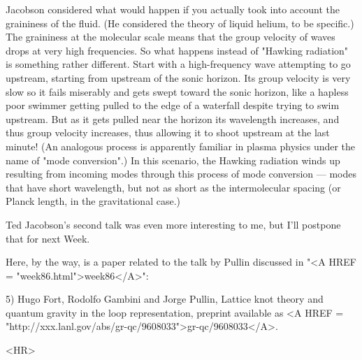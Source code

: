 Jacobson considered what would happen if you actually took into
account the graininess of the fluid.  (He considered the theory of
liquid helium, to be specific.)  The graininess at the molecular scale
means that the group velocity of waves drops at very high frequencies.
So what happens instead of "Hawking radiation" is something rather
different.  Start with a high-frequency wave attempting to go
upstream, starting from upstream of the sonic horizon.  Its group
velocity is very slow so it fails miserably and gets swept toward the
sonic horizon, like a hapless poor swimmer getting pulled to the edge
of a waterfall despite trying to swim upstream.  But as it gets pulled
near the horizon its wavelength increases, and thus group velocity
increases, thus allowing it to shoot upstream at the last minute!  (An
analogous process is apparently familiar in plasma physics under the
name of "mode conversion".)  In this scenario, the Hawking radiation
winds up resulting from incoming modes through this process of mode
conversion --- modes that have short wavelength, but not as short as
the intermolecular spacing (or Planck length, in the gravitational case.)

Ted Jacobson's second talk was even more interesting to me, but
I'll postpone that for next Week.

Here, by the way, is a paper related to the talk by Pullin discussed in 
"<A HREF = "week86.html">week86</A>":

5) Hugo Fort, Rodolfo Gambini and Jorge Pullin, Lattice knot theory
and quantum gravity in the loop representation, preprint available as
<A HREF = "http://xxx.lanl.gov/abs/gr-qc/9608033">gr-qc/9608033</A>.

<HR>



